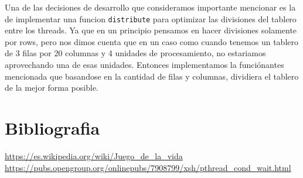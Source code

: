 \documentclass[]{article}
\begin{document}
Una de las decisiones de desarrollo que consideramos importante mencionar es la de implementar una funcion \verb|distribute| para optimizar las divisiones del tablero entre los threads. Ya que en un principio pensamos en hacer divisiones solamente por rows, pero nos dimos cuenta que en un caso como cuando tenemos un tablero de 3 filas por 20 columnas y 4 unidades de procesamiento, no estariamos aprovechando una de esas unidades. Entonces implementamos la funciónantes mencionada que basandose en la cantidad de filas y columnas, dividiera el tablero de la mejor forma posible.\\


\newpage
\section{Bibliografia}
\url{https://es.wikipedia.org/wiki/Juego_de_la_vida}\\
\url{https://pubs.opengroup.org/onlinepubs/7908799/xsh/pthread_cond_wait.html}\\
\end{document}
